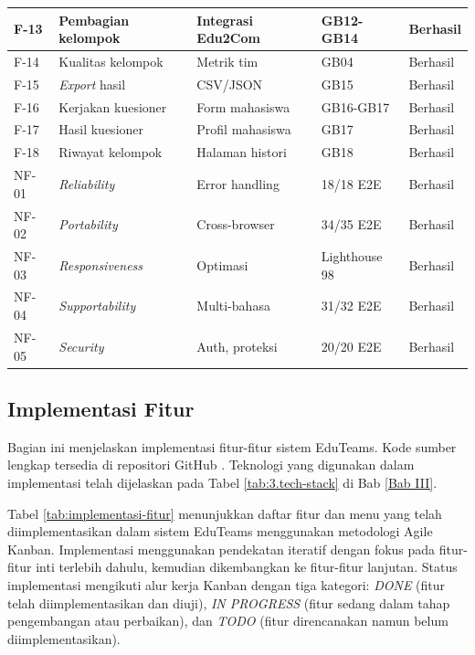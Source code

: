 \begin{longtable}{|p{}|p{}|p{}|p{}|p{}|}
	\hline
	F-13          & Pembagian kelompok      & Integrasi Edu2Com         & GB12-GB14          & Berhasil        \\
	\hline
	F-14          & Kualitas kelompok       & Metrik tim                & GB04               & Berhasil        \\
	\hline
	F-15          & \textit{Export} hasil   & CSV/JSON                  & GB15               & Berhasil        \\
	\hline
	F-16          & Kerjakan kuesioner      & Form mahasiswa            & GB16-GB17          & Berhasil        \\
	\hline
	F-17          & Hasil kuesioner         & Profil mahasiswa          & GB17               & Berhasil        \\
	\hline
	F-18          & Riwayat kelompok        & Halaman histori           & GB18               & Berhasil        \\
	\hline
	NF-01         & \textit{Reliability}    & Error handling            & 18/18 E2E          & Berhasil        \\
	\hline
	NF-02         & \textit{Portability}    & Cross-browser             & 34/35 E2E          & Berhasil        \\
	\hline
	NF-03         & \textit{Responsiveness} & Optimasi                  & Lighthouse 98      & Berhasil        \\
	\hline
	NF-04         & \textit{Supportability} & Multi-bahasa              & 31/32 E2E          & Berhasil        \\
	\hline
	NF-05         & \textit{Security}       & Auth, proteksi            & 20/20 E2E          & Berhasil        \\
	\hline
\end{longtable}

\subsection{Implementasi Fitur}

Bagian ini menjelaskan implementasi fitur-fitur sistem EduTeams. Kode sumber lengkap tersedia di repositori GitHub \cite{EduTeamsRepo2025}. Teknologi yang digunakan dalam implementasi telah dijelaskan pada Tabel \ref{tab:3.tech-stack} di Bab \ref{Bab III}.

Tabel \ref{tab:implementasi-fitur} menunjukkan daftar fitur dan menu yang telah diimplementasikan dalam sistem EduTeams menggunakan metodologi Agile Kanban. Implementasi menggunakan pendekatan iteratif dengan fokus pada fitur-fitur inti terlebih dahulu, kemudian dikembangkan ke fitur-fitur lanjutan. Status implementasi mengikuti alur kerja Kanban dengan tiga kategori: \textit{DONE} (fitur telah diimplementasikan dan diuji), \textit{IN PROGRESS} (fitur sedang dalam tahap pengembangan atau perbaikan), dan \textit{TODO} (fitur direncanakan namun belum diimplementasikan).

